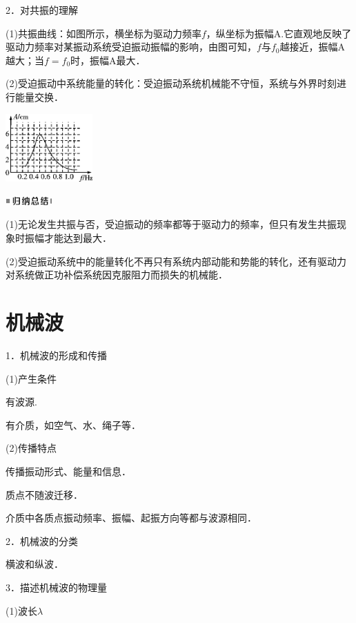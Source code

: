 2．对共振的理解

(1)共振曲线：如图所示，横坐标为驱动力频率$f$，纵坐标为振幅A.它直观地反映了驱动力频率对某振动系统受迫振动振幅的影响，由图可知，$f$与$f_0$越接近，振幅A越大；当$f=f_0$时，振幅A最大．

(2)受迫振动中系统能量的转化：受迫振动系统机械能不守恒，系统与外界时刻进行能量交换．

\begin{center}\includegraphics[width=1.31111in,height=1.02847in]{media/image520.png}\end{center}

\begin{center}\includegraphics[width=0.70764in,height=0.12292in]{media/image13.png}\end{center}

(1)无论发生共振与否，受迫振动的频率都等于驱动力的频率，但只有发生共振现象时振幅才能达到最大．

(2)受迫振动系统中的能量转化不再只有系统内部动能和势能的转化，还有驱动力对系统做正功补偿系统因克服阻力而损失的机械能．

\newpage
\section{机械波}




1．机械波的形成和传播

(1)产生条件

有波源.

有介质，如空气、水、绳子等．

(2)传播特点

传播振动形式、能量和信息．

质点不随波迁移．

介质中各质点振动频率、振幅、起振方向等都与波源相同．

2．机械波的分类

横波和纵波．

3．描述机械波的物理量

(1)波长$\lambda$

